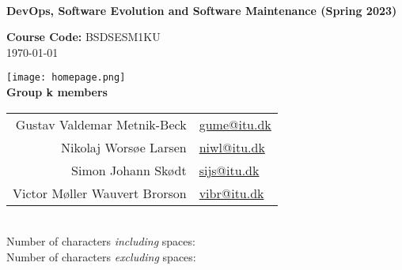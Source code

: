 \begin{titlepage}
    \begin{center}
        \\[0.5cm]
        
        \huge
        \textbf{DevOps, Software Evolution and Software Maintenance (Spring 2023)}\\
        \vspace{0.5cm}

        \Large
        \textbf{Course Code:} BSDSESM1KU\\[0.5cm]
        \large
        \today

        \texttt{[image: homepage.png]}\\

        \textbf{Group k members}\\[0.2cm]
        \begin{tabular}{r l}
            Gustav Valdemar Metnik-Beck   & \href{mailto:gume@itu.dk}{gume@itu.dk}\\
            Nikolaj Worsøe Larsen         & \href{mailto:niwl@itu.dk}{niwl@itu.dk}\\
            Simon Johann Skødt            & \href{mailto:sijs@itu.dk}{sijs@itu.dk}\\
            Victor Møller Wauvert Brorson & \href{mailto:vibr@itu.dk}{vibr@itu.dk}      
        \end{tabular}\\[1.3cm]
        
        \normalsize
        Number of characters \textit{including} spaces: \\
        Number of characters \textit{excluding} spaces: 
    \end{center}
\end{titlepage}
